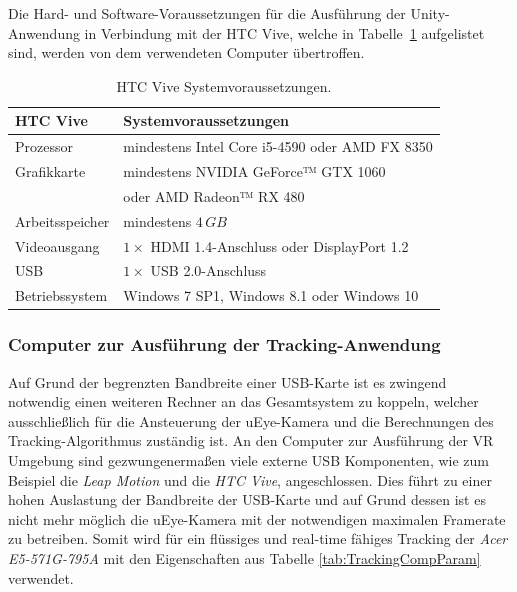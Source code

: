 Die Hard- und Software-Voraussetzungen für die Ausführung der Unity-Anwendung in Verbindung mit der HTC Vive, welche in Tabelle~\ref{table:viveReq} aufgelistet sind, werden von dem verwendeten Computer übertroffen.

\begin{table}
	\centering
	\begin{tabular}{|l|l|}
		\hline
		\Absatzbox{}
		\textbf{HTC Vive}& \textbf{Systemvoraussetzungen} \\
		\hline
		Prozessor & mindestens Intel Core i5-4590 oder AMD FX 8350\\
		\hline
		Grafikkarte & mindestens NVIDIA GeForce™ GTX 1060\\
		&oder AMD Radeon™ RX 480\\
		\hline
		Arbeitsspeicher & mindestens $4\,GB$\\		
		\hline
		Videoausgang & $1\times$ HDMI 1.4-Anschluss oder DisplayPort 1.2\\
		\hline
		USB & $1\times$ USB 2.0-Anschluss\\
		\hline
		Betriebssystem & Windows 7 SP1, Windows 8.1 oder Windows 10\\
		\hline
	\end{tabular}
	\caption{HTC Vive Systemvoraussetzungen. \cite{website:HTC_Vive_Ready}}
	\label{table:viveReq}
\end{table}

\subsubsection{Computer zur Ausführung der Tracking-Anwendung}\label{sec:TrackingComp}

Auf Grund der begrenzten Bandbreite einer USB-Karte ist es zwingend notwendig einen weiteren Rechner an das Gesamtsystem zu koppeln, welcher ausschließlich für die Ansteuerung der uEye-Kamera und die Berechnungen des Tracking-Algorithmus zuständig ist. 
An den Computer zur Ausführung der VR Umgebung sind gezwungenermaßen viele externe USB Komponenten, wie zum Beispiel die \textit{Leap Motion} und die \textit{HTC Vive}, angeschlossen. Dies führt zu einer hohen Auslastung der Bandbreite der USB-Karte und auf Grund dessen ist es nicht mehr möglich die uEye-Kamera mit der notwendigen maximalen Framerate zu betreiben. Somit wird für ein flüssiges und real-time fähiges Tracking der \textit{Acer E5-571G-795A} mit den Eigenschaften aus Tabelle \ref{tab:TrackingCompParam} verwendet.

